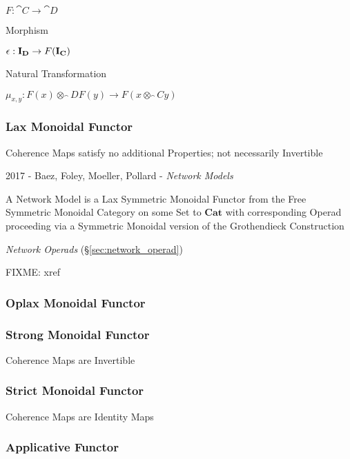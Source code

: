 $F : \cat{C} \rightarrow \cat{D}$

Morphism

$\epsilon : \mathbf{I}_\mathbf{D} \rightarrow F(\mathbf{I}_\mathbf{C})$

Natural Transformation

$\mu_{x,y} : F(x) \otimes_\cat{D} F(y) \rightarrow F(x \otimes_\cat{C} y)$



\subsubsection{Lax Monoidal Functor}\label{sec:lax_monoidal_functor}

Coherence Maps satisfy no additional Properties; not necessarily
Invertible

2017 - Baez, Foley, Moeller, Pollard - \emph{Network Models}

A Network Model is a Lax Symmetric Monoidal Functor from the Free Symmetric
Monoidal Category on some Set to $\mathbf{Cat}$ with corresponding Operad
proceeding via a Symmetric Monoidal version of the Grothendieck Construction

\emph{Network Operads} (\S\ref{sec:network_operad})

FIXME: xref



\subsubsection{Oplax Monoidal Functor}\label{sec:oplax_monoidal_functor}

\subsubsection{Strong Monoidal Functor}\label{sec:strong_monoidal_functor}

Coherence Maps are Invertible



\subsubsection{Strict Monoidal Functor}\label{sec:strict_monoidal_functor}

Coherence Maps are Identity Maps



\subsubsection{Applicative Functor}\label{sec:applicative_functor}

